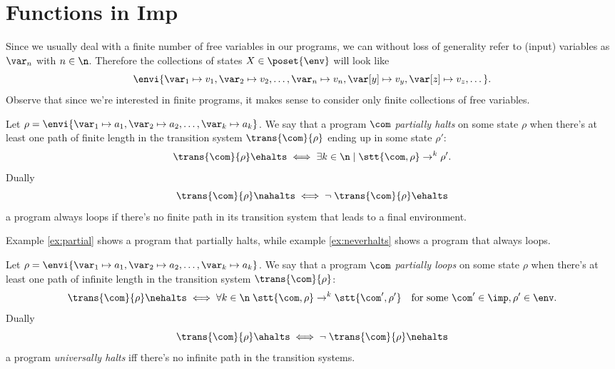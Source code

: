 \section{Functions in Imp}
Since we usually deal with a finite number of free variables in our
programs, we can without loss of generality refer to (input) variables
as \(\var_n\) with \(n\in\n\). Therefore the collections of states
\(X\in\poset{\env}\) will look like \[\envi{\var_1\mapsto v_1, \var_2
  \mapsto v_2, \dots, \var_n\mapsto v_n, \var[y] \mapsto v_y, \var[z]
  \mapsto v_z, \dots}.\] Observe that since we're interested in finite
programs, it makes sense to consider only finite collections of free
variables.


\begin{notation}
  Let \(\rho = \envi{\var_1 \mapsto a_1, \var_2\mapsto a_2, \dots,
    \var_k\mapsto a_k}\). We say that a program \(\com\)
  \emph{partially halts} on some state \(\rho\) when there's at least
  one path of finite length in the transition system
  \(\trans{\com}{\rho}\) ending up in some state \(\rho'\): \[
  \trans{\com}{\rho} \ehalts \iff \exists k \in \n \mid \stt{\com,
    \rho} \to^k \rho'.\] Dually
  \[ \trans{\com}{\rho} \nahalts \iff \neg \; \trans{\com}{\rho} \ehalts \]
  a program always loops if there's no finite path in its transition
  system that leads to a final environment.
\end{notation}
 Example \ref{ex:partial} shows a program that partially halts, while
 example \ref{ex:neverhalts} shows a program that always loops.

\begin{notation}
  Let \(\rho = \envi{\var_1 \mapsto a_1, \var_2\mapsto a_2, \dots,
    \var_k\mapsto a_k}\). We say that a program \(\com\)
  \emph{partially loops} on some state \(\rho\) when there's at least
  one path of infinite length in the transition system
  \(\trans{\com}{\rho}\): \[ \trans{\com}{\rho} \nehalts \iff \forall
  k \in \n \; \stt{\com, \rho} \to^k \stt{\com', \rho'} \quad
  \text{for some } \com'\in\imp, \rho'\in\env.\] Dually
  \begin{equation*}
    \trans{\com}{\rho} \ahalts \iff \neg \; \trans{\com}{\rho}
    \nehalts
  \end{equation*}
  a program \emph{universally halts} iff there's no infinite path in
  the transition systems.
\end{notation}


